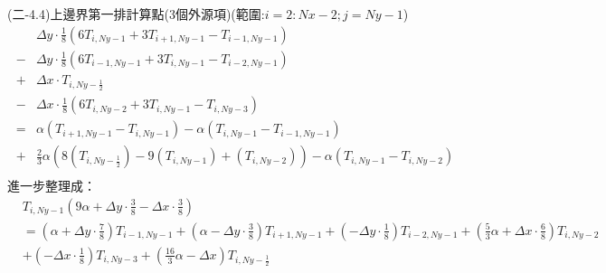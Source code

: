\documentclass[12pt]{article}
\begin{document}
\noindent (二-4.4)上邊界第一排計算點(3個外源項)(範圍:$i = 2: Nx-2 ; j = Ny-1$)\\
\begin{equation}
\begin{split}
  &\Delta y \cdot \frac{1}{8}\left(6T_{i,Ny-1}+3T_{i+1,Ny-1}-T_{i-1,Ny-1}\right)  \\
  - &\Delta y \cdot \frac{1}{8}\left(6T_{i-1,Ny-1}+3T_{i,Ny-1}-T_{i-2,Ny-1}\right) \\
  + &\Delta x \cdot T_{i,Ny-\frac{1}{2}} \\
  - &\Delta x \cdot \frac{1}{8}\left(6T_{i,Ny-2}+3T_{i,Ny-1}-T_{i,Ny-3}\right) \\
  = & \alpha(T_{i+1,Ny-1}-T_{i,Ny-1}) -  \alpha (T_{i,Ny-1}-T_{i-1,Ny-1})\\
  + & \frac{2}{3} \alpha (8(T_{i,Ny-\frac{1}{2}})-9(T_{i,Ny-1})+(T_{i,Ny-2})) -  \alpha (T_{i,Ny-1}-T_{i,Ny-2}) \\
\end{split}
\end{equation}
\noindent 進一步整理成：
\begin{equation}
\begin{split}
  &T_{i,Ny-1}(9\alpha+\Delta y \cdot \frac{3}{8}-\Delta x \cdot \frac{3}{8})\\
  &= (\alpha+\Delta y \cdot \frac{7}{8})T_{i-1,Ny-1}+(\alpha-\Delta y \cdot \frac{3}{8})T_{i+1,Ny-1}+(-\Delta y \cdot \frac{1}{8})T_{i-2,Ny-1}+(\frac{5}{3} \alpha+\Delta x \cdot \frac{6}{8})T_{i,Ny-2}\\
  &+(-\Delta x \cdot \frac{1}{8})T_{i,Ny-3}+(\frac{16}{3}\alpha-\Delta x)T_{i,Ny-\frac{1}{2}}
\end{split}
\end{equation}
\end{document}
